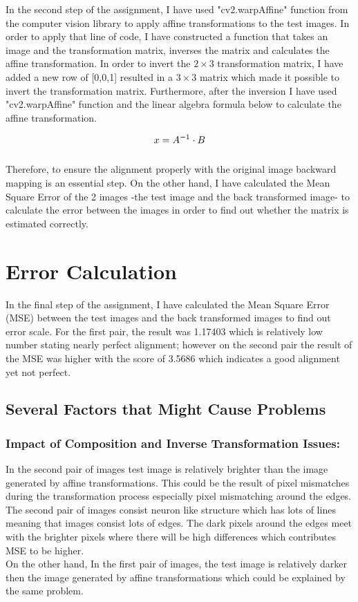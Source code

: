\documentclass{article}
\begin{document}
\quad In the second step of the assignment, I have used "cv2.warpAffine" function from the computer vision library to apply affine transformations to the test images. In order to apply that line of code, I have constructed a function that takes an image and the transformation matrix, inverses the matrix and calculates the affine transformation. In order to invert the $2\times 3$ transformation matrix, I have added a new row of [0,0,1] resulted in a $3\times 3$ matrix which made it possible to invert the transformation matrix. Furthermore, after the inversion I have used "cv2.warpAffine" function and the linear algebra formula below to calculate the affine transformation. 


\begin{equation}
  \Large {x = A^{-1}\cdot B}
\end{equation}\\

Therefore, to ensure the alignment properly with the original image backward mapping is an essential step. On the other hand, I have calculated the Mean Square Error of the 2 images -the test image and the back transformed image- to calculate the error between the images in order to find out whether the matrix is estimated correctly.

\section{Error Calculation}
\quad In the final step of the assignment, I have calculated the Mean Square Error (MSE) between the test images and the back transformed images to find out error scale. For the first pair, the result was 1.17403 which is relatively low number stating nearly perfect alignment; however on the second pair the result of the MSE was higher with the score of 3.5686 which indicates a good alignment yet not perfect. 

\subsection{Several Factors that Might Cause Problems}

\subsubsection{Impact of Composition and Inverse Transformation Issues:}
\quad In the second pair of images test image is relatively brighter than the image generated by affine transformations. This could be the result of pixel mismatches during the transformation process especially pixel mismatching around the edges. The second pair of images consist neuron like structure which has lots of lines meaning that images consist lots of edges. The dark pixels around the edges meet with the brighter pixels where there will be high differences which contributes MSE to be higher.\\

\quad On the other hand, In the first pair of images, the test image is relatively darker then the image generated by affine transformations which could be explained by the same problem. 
\end{document}
